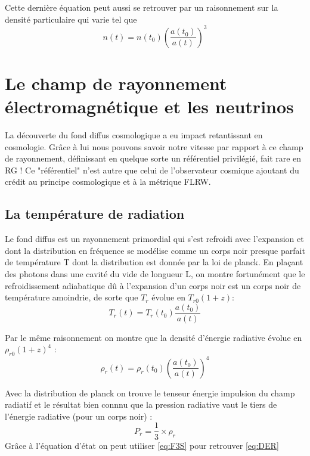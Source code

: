 \documentclass[10pt, a4paper]{report}
\numberwithin{equation}{subsection}
\begin{document}
Cette dernière équation peut aussi se retrouver par un raisonnement sur la densité particulaire qui varie tel que 
\begin{equation} \label{eq:NP}
\boxed{n(t) = n(t_0) \left(\frac{a(t_0)}{a(t)}\right)^3}
\end{equation}

\section{Le champ de rayonnement électromagnétique et les neutrinos}
La découverte du fond diffus cosmologique a eu impact retantissant en cosmologie. Grâce à lui nous pouvons savoir notre vitesse par rapport à ce champ de rayonnement, définissant en quelque sorte un référentiel privilégié, fait rare en RG ! Ce "référentiel" n'est autre que celui de l'observateur cosmique ajoutant du crédit au principe cosmologique et à la métrique FLRW. 
\subsection{La température de radiation}
Le fond diffus est un rayonnement primordial qui s'est refroidi avec l'expansion et dont la distribution en fréquence se modélise comme un corps noir presque parfait de température T dont la distribution est donnée par la loi de planck. En plaçant des photons dans une cavité du vide de longueur L, on montre fortunément que le refroidissement adiabatique dû à l'expansion d'un corps noir est un corps noir de température amoindrie, de sorte que $T_r$ évolue en $T_{r0} (1+z)$:
\begin{equation} \label{eq:TRRA}
\boxed{T_r(t) = T_r(t_0) \frac{a(t_0)}{a(t)}}
\end{equation}

Par le même raisonnement on montre que la densité d'énergie radiative évolue en $\rho_{r0} (1+z)^4$ :
\begin{equation} \label{eq:DER}
\boxed{\rho_r(t) = \rho_r(t_0)  \left({\frac{a(t_0)}{a(t)}}\right)^4}
\end{equation}

Avec la distribution de planck on trouve le tenseur énergie impulsion du champ radiatif et le résultat bien connnu que la pression radiative vaut le tiers de l'énergie radiative (pour un corps noir) :
\begin{equation} \label{eq:EER}
\boxed{P_r = \frac{1}{3} \times \rho_r}
\end{equation}
Grâce à l'équation d'état on peut utiliser \ref{eq:F3S} pour retrouver \ref{eq:DER} 
\end{document}
